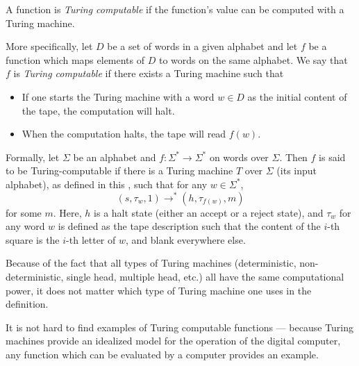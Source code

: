 \documentclass[12pt]{article}
\begin{document}
A function is \emph{Turing computable} if the function's value can be
computed with a Turing machine.

More specifically, let $D$ be a set of words in a given alphabet and
let $f$ be a function which maps elements of $D$ to words on the
same alphabet.  We say that $f$ is \emph{Turing computable} if there
exists a Turing machine such that
\begin{itemize}
\item If one starts the Turing machine with a word $w \in D$ as the
initial content of the tape, the computation will halt.
\item When the computation halts, the tape will read $f(w)$.
\end{itemize}

Formally, let $\Sigma$ be an alphabet and $f:\Sigma^* \to \Sigma^*$ on words over $\Sigma$.  Then $f$ is said to be Turing-computable if there is a Turing machine $T$ over $\Sigma$ (its input alphabet), as defined in this , such that for any $w\in \Sigma^*$,
$$(s,\tau_w,1) \rightarrow^* (h,\tau_{f(w)},m)$$
for some $m$.  Here, $h$ is a halt state (either an accept or a reject state), and $\tau_w$ for any word $w$ is defined as the tape description such that the content of the $i$-th square is the $i$-th letter of $w$, and blank everywhere else.

Because of the fact that all types of Turing machines (deterministic,
non-deterministic, single head, multiple head, etc.) all have the same
computational power, it does not matter which type of Turing machine
one uses in the definition.

It is not hard to find examples of Turing computable functions ---
because Turing machines provide an idealized model for the operation
of the digital computer, any function which can be evaluated by a
computer provides an example.
\end{document}

